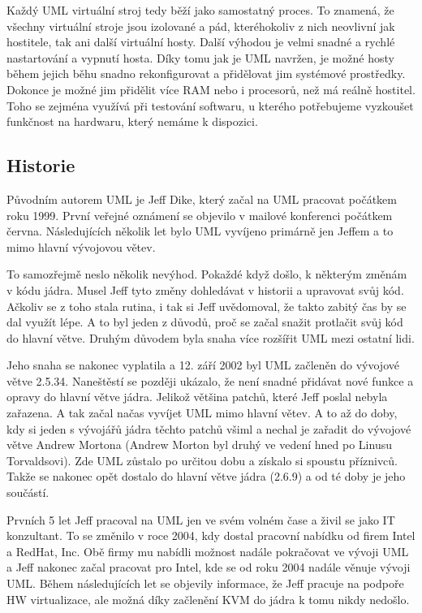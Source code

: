 Každý UML virtuální stroj tedy běží jako samostatný proces. To znamená, že všechny virtuální stroje jsou izolované a pád, kteréhokoliv z nich neovlivní jak hostitele, tak ani další virtuální hosty. Další výhodou je velmi snadné a rychlé nastartování a vypnutí hosta. Díky tomu jak je UML navržen, je možné hosty během jejich běhu snadno rekonfigurovat a přidělovat jim systémové prostředky. Dokonce je možné jim přidělit více RAM nebo i procesorů, než má reálně hostitel. Toho se zejména využívá při testování softwaru, u kterého potřebujeme vyzkoušet funkčnost na hardwaru, který nemáme k dispozici.
\subsection{Historie}
Původním autorem UML je Jeff Dike, který začal na UML pracovat počátkem roku 1999. První veřejné oznámení se objevilo v mailové konferenci počátkem června. Následujících několik let bylo UML vyvíjeno primárně jen Jeffem a to mimo hlavní vývojovou větev.

To samozřejmě neslo několik nevýhod. Pokaždé když došlo, k některým změnám v kódu jádra. Musel Jeff tyto změny dohledávat v historii a upravovat svůj kód. Ačkoliv se z toho stala rutina, i tak si Jeff uvědomoval, že takto zabitý čas by se dal využít lépe. A to byl jeden z důvodů, proč se začal snažit protlačit svůj kód do hlavní větve. Druhým důvodem byla snaha více rozšířit UML mezi ostatní lidi.

Jeho snaha se nakonec vyplatila a 12. září 2002 byl UML začleněn do vývojové větve 2.5.34. Naneštěstí se později ukázalo, že není snadné přidávat nové funkce a opravy do hlavní větve jádra. Jelikož většina patchů, které Jeff poslal nebyla zařazena. A tak začal načas vyvíjet UML mimo hlavní větev. A to až do doby, kdy si jeden s vývojářů jádra těchto patchů všiml a nechal je zařadit do vývojové větve Andrew Mortona (Andrew Morton byl druhý ve vedení hned po Linusu Torvaldsovi). Zde UML zůstalo po určitou dobu a získalo si spoustu příznivců. Takže se nakonec opět dostalo do hlavní větve jádra (2.6.9) a od té doby je jeho součástí.

Prvních 5 let Jeff pracoval na UML jen ve svém volném čase a živil se jako IT konzultant. To se změnilo v roce 2004, kdy dostal pracovní nabídku od firem Intel a RedHat, Inc. Obě firmy mu nabídli možnost nadále pokračovat ve vývoji UML a Jeff nakonec začal pracovat pro Intel, kde se od roku 2004 nadále věnuje vývoji UML. Během následujících let se objevily informace, že Jeff pracuje na podpoře HW virtualizace, ale možná díky začlenění KVM do jádra k tomu nikdy nedošlo. 

